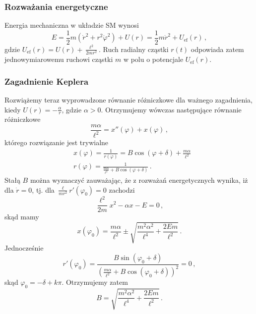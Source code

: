 \documentclass[../main.tex]{subfiles}
\begin{document}
\subsubsection{Rozważania energetyczne}
Energia mechaniczna w układzie SM wynosi
\begin{equation*}
    E=\frac{1}{2}m(\dot{r}^2+r^2\dot{\varphi}^2)+U(r)=\frac{1}{2}m\dot{r}^2+U_\text{ef}(r)\,,
\end{equation*}
gdzie \(U_\text{ef}(r)=U(r)+\frac{\ell^2}{2mr^2}\). Ruch radialny cząstki \(r(t)\) odpowiada zatem
jednowymiarowemu ruchowi cząstki \(m\) w polu o potencjale \(U_\text{ef}(r)\).
\subsubsection{Zagadnienie Keplera}
Rozwiążemy teraz wyprowadzone równanie różniczkowe dla ważnego zagadnienia, kiedy
\(U(r)=-\frac{\alpha}{r}\), gdzie \(\alpha>0\). Otrzymujemy wówczas następujące równanie różniczkowe
\begin{equation*}
    \frac{m\alpha}{\ell^2}=x''(\varphi)+x(\varphi)\,,
\end{equation*}
którego rozwiązanie jest trywialne
\begin{equation*}
\begin{split}
     &x(\varphi)=\frac{1}{r(\varphi)}=B\cos(\varphi+\delta)+\frac{m\alpha}{\ell^2}\\
     &r(\varphi)=\frac{1}{\frac{m\alpha}{\ell^2}+B\cos(\varphi+\delta)}\,.
\end{split}
\end{equation*}
Stałą \(B\) można wyznaczyć zauważając, że z rozważań energetycznych wynika, iż dla \(\dot r=0\),
tj. dla \(\frac{\ell}{mr^2}r'(\varphi_0)=0\) zachodzi
\begin{equation*}
    \frac{\ell^2}{2m}x^2-\alpha x-E=0\,,
\end{equation*}
skąd mamy
\begin{equation*}
    x(\varphi_0)=\frac{m\alpha}{\ell^2}\pm\sqrt{\frac{m^2\alpha^2}{\ell^4}+\frac{2Em}{\ell^2}}\,.
\end{equation*}
Jednocześnie 
\begin{equation*}
    r'(\varphi_0)=\frac{B\sin(\varphi_0+\delta)}{\left(\frac{m\alpha}{\ell^2}+B\cos(\varphi_0+\delta)\right)^2}=0\,,
\end{equation*}
skąd \(\varphi_0=-\delta+k\pi\). Otrzymujemy zatem
\begin{equation*}
    B=\sqrt{\frac{m^2\alpha^2}{\ell^4}+\frac{2Em}{\ell^2}}\,.
\end{equation*}
\end{document}
